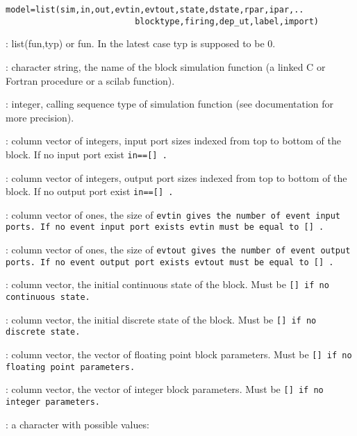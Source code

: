 \begin{verbatim}
model=list(sim,in,out,evtin,evtout,state,dstate,rpar,ipar,..
                          blocktype,firing,dep_ut,label,import)
\end{verbatim}
\begin{scitem}
\item[{\verb?sim?}]
: list(fun,typ) or fun. In the latest case typ is supposed to be 0.
\begin{scitem}
\item[{\verb?fun?}]
: character string, the name of the block simulation function (a 
linked C or Fortran procedure  or a scilab function).
\item[{\verb?typ?}]
: integer, calling sequence type of simulation function (see
documentation for more precision).
\end{scitem}
\item[{\verb?in?}]
: column vector of integers, input port sizes indexed from top to
bottom of the block. If no input port exist %
\tt in==[]%
\rm .
\item[{\verb?out?}]
: column vector of integers, output port sizes indexed from top to
bottom of the block. If no output port exist %
\tt in==[]%
\rm .
\item[{\verb?evtin?}]
: column vector of ones, the size of %
\tt evtin %
\rm gives the number of
event input ports. If no event input port exists %
\tt evtin %
\rm must be equal
to %
\tt []%
\rm .
\item[{\verb?evtout?}]
: column vector of ones, the size of %
\tt evtout %
\rm gives the number of
event output ports. If no event output port exists %
\tt evtout %
\rm must be equal
to %
\tt []%
\rm .
\item[{\verb?state?}]
: column vector, the initial continuous state of the block. Must be
%
\tt [] %
\rm if no continuous state.
\item[{\verb?dstate?}]
: column vector, the initial discrete state of the block. Must be
%
\tt [] %
\rm if no discrete state.
\item[{\verb?rpar?}]
: column vector, the vector of floating point block parameters. Must be
%
\tt [] %
\rm if no floating point parameters.
\item[{\verb?ipar?}]
: column vector, the vector of integer  block parameters. Must be
%
\tt [] %
\rm if no integer parameters.
\item[{\verb?blocktype?}]
: a character with possible values:
\begin{scitem}

\end{scitem}
\end{scitem}
